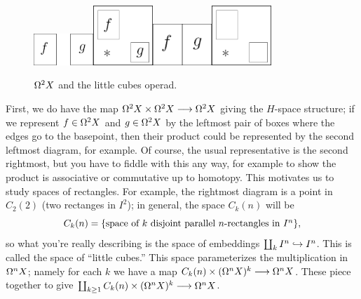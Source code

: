 \begin{figure}[ht!]
\centering\includegraphics[width=0.2\textwidth]{figures/figure35-1.pdf}\;\includegraphics[width=0.2\textwidth]{figures/figure35-2.pdf}\;\includegraphics[width=0.2\textwidth]{figures/figure35-3.pdf}\;\includegraphics[width=0.2\textwidth]{figures/figure35-4.pdf}
\caption{\small $\Omega^2 X$ and the little cubes operad.}
\end{figure}
First, we do have the map $\Omega^2 X \times \Omega^2 X \longrightarrow \Omega^2 X$ giving the $H$-space structure; if we represent $f \in \Omega^2 X$ and $g \in \Omega^2 X$ by the leftmost pair of boxes where the edges go to the basepoint, then their product could be represented by the second leftmost diagram, for example.  Of course, the usual representative is the second rightmost, but you have to fiddle with this any way, for example to show the product is associative or commutative up to homotopy.  This motivates us to study spaces of rectangles.  For example, the rightmost diagram is a point in $C_2(2)$ (two rectanges in $I^2$); in general, the space $C_k(n)$ will be
\[
C_k(n) = \{ \hbox{space of $k$ disjoint parallel $n$-rectangles in $I^n$} \}
,\]
so what you're really describing is the space of embeddings $\coprod_k I^n \hookrightarrow I^n$.  This is called the space of ``little cubes.''  This space parameterizes the multiplication in $\Omega^n X$; namely for each $k$ we have a map $C_k(n) \times (\Omega^n X)^k \longrightarrow \Omega^n X$. These piece together to give $\coprod_{k \ge 1} C_k(n) \times (\Omega^n X)^k \longrightarrow \Omega^n X$.

